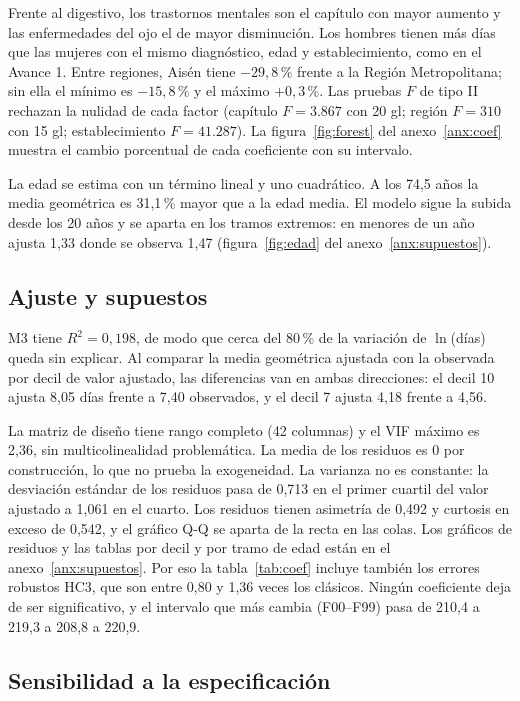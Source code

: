 \documentclass[10.5pt,a4paper,headings=small,abstract=false,bibliography=totoc,listof=totoc]{scrartcl}
\newcommand{\pct}{\,\%}
\newcommand{\anexo}[1]{anexo~\ref{#1}}
\begin{document}
Frente al digestivo, los trastornos mentales son el capítulo con mayor aumento y las enfermedades del ojo el de mayor disminución. Los hombres tienen más días que las mujeres con el mismo diagnóstico, edad y establecimiento, como en el Avance 1. Entre regiones, Aisén tiene $-29{,}8\pct{}$ frente a la Región Metropolitana; sin ella el mínimo es $-15{,}8\pct{}$ y el máximo $+0{,}3\pct{}$. Las pruebas $F$ de tipo II rechazan la nulidad de cada factor (capítulo $F=3.867$ con 20 gl; región $F=310$ con 15 gl; establecimiento $F=41.287$). La figura~\ref{fig:forest} del \anexo{anx:coef} muestra el cambio porcentual de cada coeficiente con su intervalo.

La edad se estima con un término lineal y uno cuadrático. A los 74,5 años la media geométrica es 31,1\pct{} mayor que a la edad media. El modelo sigue la subida desde los 20 años y se aparta en los tramos extremos: en menores de un año ajusta 1,33 donde se observa 1,47 (figura~\ref{fig:edad} del \anexo{anx:supuestos}).

\subsection{Ajuste y supuestos}

M3 tiene $R^2=0{,}198$, de modo que cerca del 80\pct{} de la variación de $\ln$(días) queda sin explicar. Al comparar la media geométrica ajustada con la observada por decil de valor ajustado, las diferencias van en ambas direcciones: el decil 10 ajusta 8,05 días frente a 7,40 observados, y el decil 7 ajusta 4,18 frente a 4,56.

La matriz de diseño tiene rango completo (42 columnas) y el VIF máximo es 2,36, sin multicolinealidad problemática. La media de los residuos es 0 por construcción, lo que no prueba la exogeneidad. La varianza no es constante: la desviación estándar de los residuos pasa de 0,713 en el primer cuartil del valor ajustado a 1,061 en el cuarto. Los residuos tienen asimetría de 0,492 y curtosis en exceso de 0,542, y el gráfico Q-Q se aparta de la recta en las colas. Los gráficos de residuos y las tablas por decil y por tramo de edad están en el \anexo{anx:supuestos}. Por eso la tabla~\ref{tab:coef} incluye también los errores robustos HC3, que son entre 0,80 y 1,36 veces los clásicos. Ningún coeficiente deja de ser significativo, y el intervalo que más cambia (F00--F99) pasa de 210,4 a 219,3 a 208,8 a 220,9.

\subsection{Sensibilidad a la especificación}\label{sec:sens}
\end{document}
